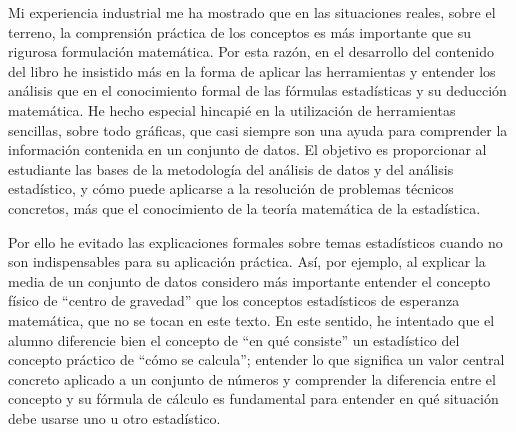 \documentclass[
  letterpaper,
]{scrbook}
\begin{document}
Mi experiencia industrial me ha mostrado que en las situaciones reales,
sobre el terreno, la comprensión práctica de los conceptos es más
importante que su rigurosa formulación matemática. Por esta razón, en el
desarrollo del contenido del libro he insistido más en la forma de
aplicar las herramientas y entender los análisis que en el conocimiento
formal de las fórmulas estadísticas y su deducción matemática. He hecho
especial hincapié en la utilización de herramientas sencillas, sobre
todo gráficas, que casi siempre son una ayuda para comprender la
información contenida en un conjunto de datos. El objetivo es
proporcionar al estudiante las bases de la metodología del análisis de
datos y del análisis estadístico, y cómo puede aplicarse a la resolución
de problemas técnicos concretos, más que el conocimiento de la teoría
matemática de la estadística.

Por ello he evitado las explicaciones formales sobre temas estadísticos
cuando no son indispensables para su aplicación práctica. Así, por
ejemplo, al explicar la media de un conjunto de datos considero más
importante entender el concepto físico de ``centro de gravedad'' que los
conceptos estadísticos de esperanza matemática, que no se tocan en este
texto. En este sentido, he intentado que el alumno diferencie bien el
concepto de ``en qué consiste'' un estadístico del concepto práctico de
``cómo se calcula''; entender lo que significa un valor central concreto
aplicado a un conjunto de números y comprender la diferencia entre el
concepto y su fórmula de cálculo es fundamental para entender en qué
situación debe usarse uno u otro estadístico.
\end{document}
